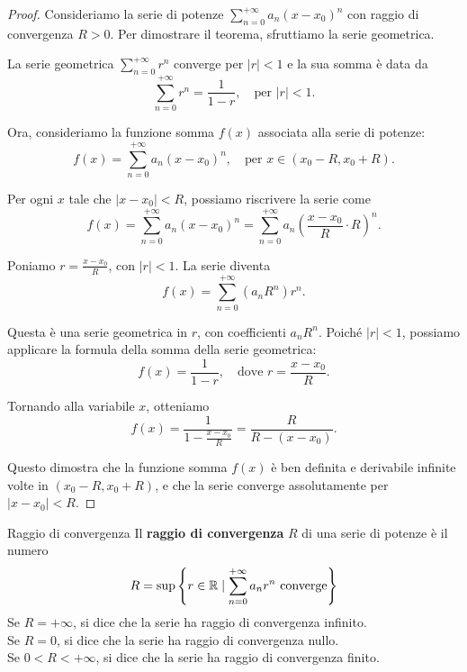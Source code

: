 \begin{proof}
  Consideriamo la serie di potenze $\sum_{n=0}^{+\infty} a_n (x-x_0)^n$ con raggio di convergenza $R > 0$. Per dimostrare il teorema, sfruttiamo la serie geometrica.

  La serie geometrica $\sum_{n=0}^{+\infty} r^n$ converge per $\lvert r \rvert < 1$ e la sua somma è data da
  \[
      \sum_{n=0}^{+\infty} r^n = \frac{1}{1-r}, \quad \text{per } \lvert r \rvert < 1.
  \]

  Ora, consideriamo la funzione somma $f(x)$ associata alla serie di potenze:
  \[
      f(x) = \sum_{n=0}^{+\infty} a_n (x-x_0)^n, \quad \text{per } x \in (x_0-R, x_0+R).
  \]

  Per ogni $x$ tale che $\lvert x - x_0 \rvert < R$, possiamo riscrivere la serie come
  \[
      f(x) = \sum_{n=0}^{+\infty} a_n (x-x_0)^n = \sum_{n=0}^{+\infty} a_n \left( \frac{x-x_0}{R} \cdot R \right)^n.
  \]

  Poniamo $r = \frac{x-x_0}{R}$, con $\lvert r \rvert < 1$. La serie diventa
  \[
      f(x) = \sum_{n=0}^{+\infty} \left( a_n R^n \right) r^n.
  \]

  Questa è una serie geometrica in $r$, con coefficienti $a_n R^n$. Poiché $\lvert r \rvert < 1$, possiamo applicare la formula della somma della serie geometrica:
  \[
      f(x) = \frac{1}{1-r}, \quad \text{dove } r = \frac{x-x_0}{R}.
  \]

  Tornando alla variabile $x$, otteniamo
  \[
      f(x) = \frac{1}{1 - \frac{x-x_0}{R}} = \frac{R}{R - (x-x_0)}.
  \]

  Questo dimostra che la funzione somma $f(x)$ è ben definita e derivabile infinite volte in $(x_0-R, x_0+R)$, e che la serie converge assolutamente per $\lvert x - x_0 \rvert < R$.
\end{proof}
\begin{definizione}{Raggio di convergenza}
  Il \textbf{raggio di convergenza} $R$ di una serie di potenze è il numero
  \[
      R = \sup \left\{ r \in \mathbb{R} \mid \sum_{n=0}^{+\infty} a_n r^n \text{ converge} \right\}
  \]
  Se $R = +\infty$, si dice che la serie ha raggio di convergenza infinito.\\
  Se $R = 0$, si dice che la serie ha raggio di convergenza nullo.\\
  Se $0 < R < +\infty$, si dice che la serie ha raggio di convergenza finito.
\end{definizione}


